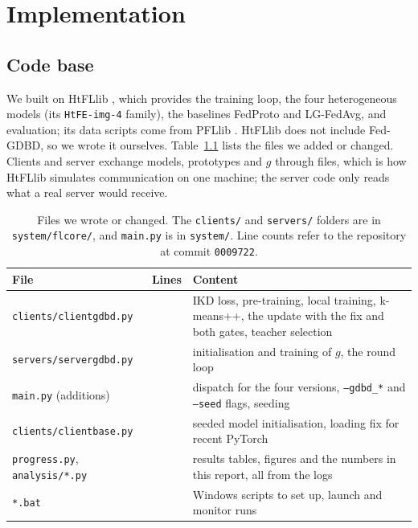 \chapter{Implementation}
\label{ch:impl}

\section{Code base}

We built on HtFLlib \cite{zhang2025htfllib}, which provides the training loop, the four heterogeneous models (its \texttt{HtFE-img-4} family), the baselines FedProto and LG-FedAvg, and evaluation; its data scripts come from PFLlib \cite{zhang2025pfllib}. HtFLlib does not include Fed-GDBD, so we wrote it ourselves. Table~\ref{tab:files} lists the files we added or changed. Clients and server exchange models, prototypes and $g$ through files, which is how HtFLlib simulates communication on one machine; the server code only reads what a real server would receive.

\begin{table}[htbp]
\centering
\caption[Files we wrote or changed]{Files we wrote or changed. The \texttt{clients/} and \texttt{servers/} folders are in \texttt{system/flcore/}, and \texttt{main.py} is in \texttt{system/}. Line counts refer to the repository at commit \texttt{0009722}.}
\label{tab:files}
\small
\begin{tabularx}{\textwidth}{>{\raggedright\arraybackslash}p{4.3cm}>{\raggedleft\arraybackslash}p{1.0cm}>{\raggedright\arraybackslash}X}
\toprule
File & Lines & Content \\
\midrule
\texttt{clients/clientgdbd.py} & 299 & IKD loss, pre-training, local training, k-means++, the update with the fix and both gates, teacher selection \\
\texttt{servers/servergdbd.py} & 102 & initialisation and training of $g$, the round loop \\
\texttt{main.py} (additions) & & dispatch for the four versions, \texttt{--gdbd\_*} and \texttt{--seed} flags, seeding \\
\texttt{clients/clientbase.py} & & seeded model initialisation, loading fix for recent PyTorch \\
\texttt{progress.py}, \texttt{analysis/*.py} & & results tables, figures and the numbers in this report, all from the logs \\
\texttt{*.bat} & & Windows scripts to set up, launch and monitor runs \\
\bottomrule
\end{tabularx}
\end{table}

